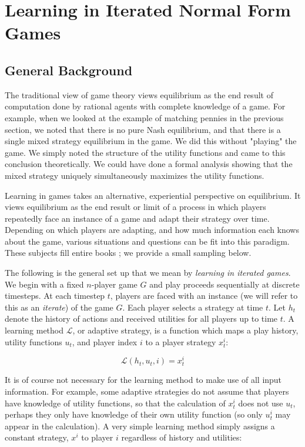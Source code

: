 \section{Learning in Iterated Normal Form Games}


\subsection{General Background}
The traditional view of game theory views equilibrium as the end result of computation done by rational agents with complete knowledge of a game. For example, when we looked at the example of matching pennies in the previous section, we noted that there is no pure Nash equilibrium, and that there is a single mixed strategy equilibrium in the game. We did this without "playing" the game. We simply noted the structure of the utility functions and came to this conclusion theoretically. We could have done a formal analysis showing that the mixed strategy uniquely simultaneously maximizes the utility functions.

Learning in games takes an alternative, experiential perspective on equilibrium. It views equilibrium as the end result or limit of a process in which players repeatedly face an instance of a game and adapt their strategy over time. Depending on which players are adapting, and how much information each knows about the game, various situations and questions can be fit into this paradigm. These subjects fill entire books \cite{fudenberg1998theory}; we provide a small sampling below.

The following is the general set up that we mean by {\em learning in iterated games}. We begin with a fixed $n$-player game $G$ and play proceeds sequentially at discrete timesteps. At each timestep $t$, players are faced with an instance (we will refer to this as an {\em iterate}) of the game $G$. Each player selects a strategy at time $t$. Let $h_t$ denote the history of actions and received utilities for all players up to time $t$. A learning method $\mathcal{L}$, or adaptive strategy, is a function which maps a play history, utility functions $u_t$, and player index $i$ to a player strategy $x^i_t$:

\begin{equation}
    \mathcal{L}(h_t, u_t, i) = x^i_t
\end{equation}

It is of course not necessary for the learning method to make use of all input information. For example, some adaptive strategies do not assume that players have knowledge of utility functions, so that the calculation of $x^i_t$ does not use $u_t$, perhaps they only have knowledge of their own utility function (so only $u_t^i$ may appear in the calculation). A very simple learning method simply assigns a constant strategy, $x^i$ to player $i$ regardless of history and utilities:

